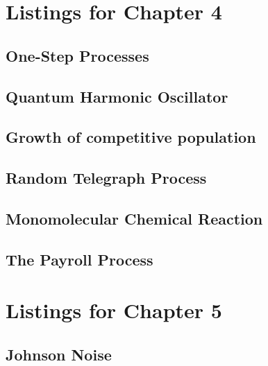 \section{Listings for Chapter 4}

\subsection{One-Step Processes}

\subsection{Quantum Harmonic Oscillator}

\subsection{Growth of competitive population}

\subsection{Random Telegraph Process}

\subsection{Monomolecular Chemical Reaction}

\subsection{The Payroll Process}

\section{Listings for Chapter 5}

\subsection{Johnson Noise}

